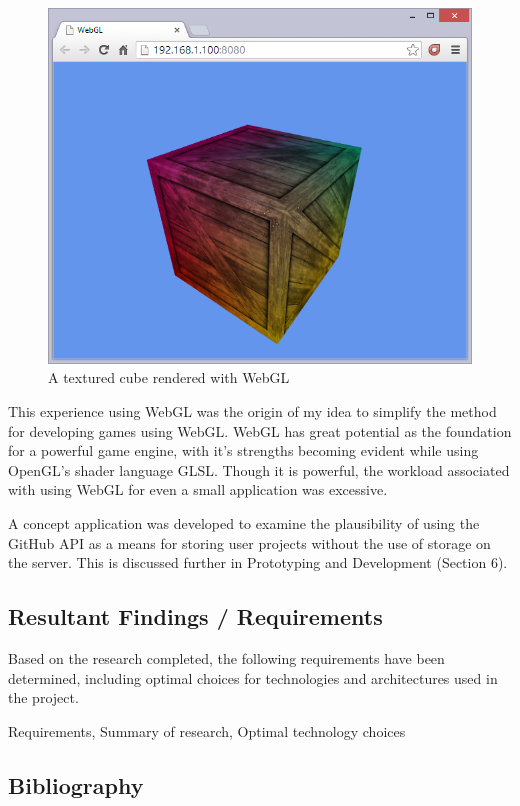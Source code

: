 \documentclass[a4paper, 12pt]{article}
\begin{document}
\begin{figure}[h]
	\centering
	\includegraphics[scale=0.5]{webgl}
	\caption{A textured cube rendered with WebGL}
	\label{fig:webgl}
\end{figure}

This experience using WebGL was the origin of my idea to simplify the method for developing games using WebGL. WebGL has great potential as the foundation for a powerful game engine, with it's strengths becoming evident while using OpenGL's shader language GLSL. Though it is powerful, the workload associated with using WebGL for even a small application was excessive.

A concept application was developed to examine the plausibility of using the GitHub API as a means for storing user projects without the use of storage on the server. This is discussed further in Prototyping and Development (Section 6).

\subsection{Resultant Findings / Requirements}

Based on the research completed, the following requirements have been determined, including optimal choices for technologies and architectures used in the project.

Requirements, Summary of research, Optimal technology choices

\subsection{Bibliography}
\end{document}

